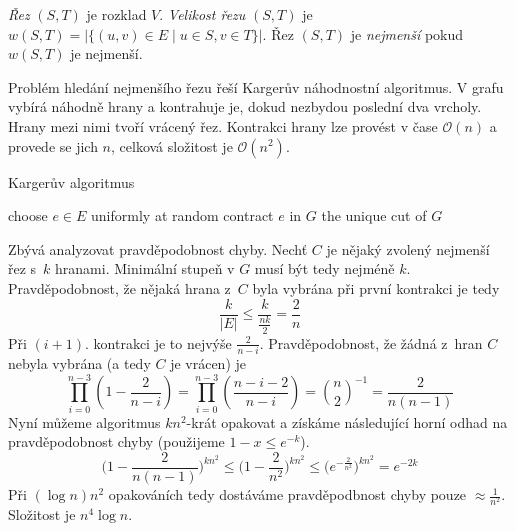 \begin{definition}
    {\em Řez} $(S,T)$ je rozklad $V$.
    {\em Velikost řezu} $(S,T)$ je
    $w(S,T) = \lvert \{ (u,v) \in E \mid u \in S, v \in T \} \rvert$.
    Řez $(S,T)$ je {\em nejmenší} pokud $w(S,T)$ je nejmenší.
\end{definition}

Problém hledání nejmenšího řezu řeší Kargerův náhodnostní algoritmus.
V grafu vybírá náhodně hrany a kontrahuje je, dokud nezbydou poslední
dva vrcholy. Hrany mezi nimi tvoří vrácený řez.
Kontrakci hrany lze provést v čase $\mathcal{O}(n)$ a provede se jich
$n$, celková složitost je $\mathcal{O}(n^2)$.

\begin{algorithm}
\caption{Kargerův algoritmus}
\label{alg:karger}
\begin{algorithmic}[1]
        \State choose $e \in E$ uniformly at random
        \State contract $e$ in $G$
    \EndWhile
    \State \Return the unique cut of $G$
\EndFunction
\end{algorithmic}
\end{algorithm}

Zbývá analyzovat pravděpodobnost chyby. Nechť $C$ je nějaký zvolený
nejmenší řez s~$k$ hranami. Minimální stupeň v $G$ musí být tedy nejméně
$k$. Pravděpodobnost, že nějaká hrana z~$C$ byla vybrána při první
kontrakci je tedy
\[
    \frac{k}{\lvert E \rvert} \leq \frac{k}{\frac{nk}{2}} = \frac{2}{n}
\]
Při $(i+1)$. kontrakci je to nejvýše $\frac{2}{n-i}$. Pravděpodobnost,
že žádná z~hran $C$ nebyla vybrána (a tedy $C$ je vrácen) je
\[
    \prod_{i = 0}^{n - 3} (1 - \frac{2}{n-i}) =
    \prod_{i = 0}^{n - 3} (\frac{n - i - 2}{n-i}) =
    {n \choose 2}^{-1} =
    \frac{2}{n(n-1)}
\]
Nyní můžeme algoritmus $kn^2$-krát opakovat a získáme následující
horní odhad na pravděpodobnost chyby
(použijeme $1 - x \leq e^{-k}$).
\[
    \big (1 - \frac{2}{n(n-1)} \big )^{kn^2}
    \leq \big (1 - \frac{2}{n^2} \big )^{kn^2}
    \leq \big (e^{-\frac{2}{n^2}} \big )^{kn^2}
    = e^{-2k}
\]
Při $(\log n) n^2$ opakováních tedy dostáváme pravděpodbnost chyby
pouze $\approx \frac{1}{n^2}$. Složitost je $n^4 \log n$.
